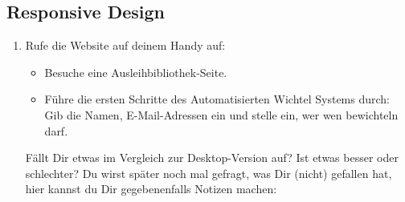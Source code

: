 \subsection{Responsive Design}
\begin{enumerate}
\item Rufe die Website auf deinem Handy auf:
\begin{itemize}
\item Besuche eine Ausleihbibliothek-Seite. 
\item Führe die ersten Schritte des Automatisierten Wichtel Systems durch: Gib die Namen, E-Mail-Adressen ein und stelle ein, wer wen bewichteln darf.
\end{itemize}
Fällt Dir etwas im Vergleich zur Desktop-Version auf? Ist etwas besser oder schlechter? Du wirst später noch mal gefragt, was Dir (nicht) gefallen hat, hier kannst du Dir gegebenenfalls Notizen machen:
\interviewText{\interviewTextL}
\end{enumerate}